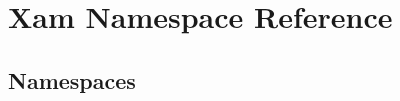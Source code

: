 \hypertarget{namespace_xam}{}\section{Xam Namespace Reference}
\label{namespace_xam}
\subsection*{Namespaces}
\begin{DoxyCompactItemize}
\end{DoxyCompactItemize}
